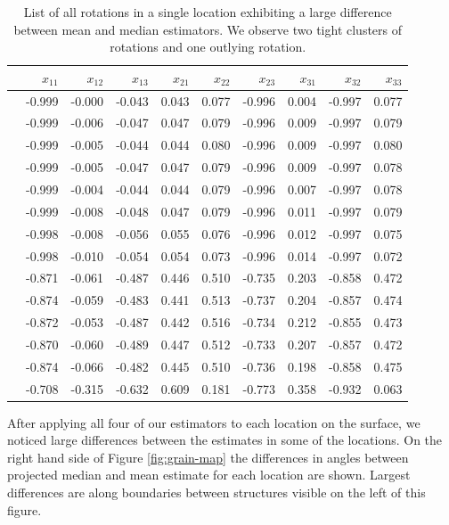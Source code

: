 \begin{table}[ht]
\caption{\label{tab:rotations} List of all rotations in a single location exhibiting a large difference between mean and median estimators. We observe two tight clusters of rotations and one outlying rotation. }
\begin{center}
\begin{tabular}{rrrrrrrrrr}
  \hline
 & $x_{11}$ & $x_{12}$& $x_{13}$& $x_{21}$& $x_{22}$& $x_{23}$& $x_{31}$& $x_{32}$& $x_{33}$ \\ 
  \hline
   & -0.999 & -0.000 & -0.043 & 0.043 & 0.077 & -0.996 & 0.004 & -0.997 & 0.077 \\ 
   & -0.999 & -0.006 & -0.047 & 0.047 & 0.079 & -0.996 & 0.009 & -0.997 & 0.079 \\ 
   & -0.999 & -0.005 & -0.044 & 0.044 & 0.080 & -0.996 & 0.009 & -0.997 & 0.080 \\ 
   & -0.999 & -0.005 & -0.047 & 0.047 & 0.079 & -0.996 & 0.009 & -0.997 & 0.078 \\ 
   & -0.999 & -0.004 & -0.044 & 0.044 & 0.079 & -0.996 & 0.007 & -0.997 & 0.078 \\ 
   & -0.999 & -0.008 & -0.048 & 0.047 & 0.079 & -0.996 & 0.011 & -0.997 & 0.079 \\ 
   & -0.998 & -0.008 & -0.056 & 0.055 & 0.076 & -0.996 & 0.012 & -0.997 & 0.075 \\ 
   & -0.998 & -0.010 & -0.054 & 0.054 & 0.073 & -0.996 & 0.014 & -0.997 & 0.072 \\ [5pt]
   & -0.871 & -0.061 & -0.487 & 0.446 & 0.510 & -0.735 & 0.203 & -0.858 & 0.472 \\ 
   & -0.874 & -0.059 & -0.483 & 0.441 & 0.513 & -0.737 & 0.204 & -0.857 & 0.474 \\ 
   & -0.872 & -0.053 & -0.487 & 0.442 & 0.516 & -0.734 & 0.212 & -0.855 & 0.473 \\ 
   & -0.870 & -0.060 & -0.489 & 0.447 & 0.512 & -0.733 & 0.207 & -0.857 & 0.472 \\ 
   & -0.874 & -0.066 & -0.482 & 0.445 & 0.510 & -0.736 & 0.198 & -0.858 & 0.475 \\ [5pt] 
 & -0.708 & -0.315 & -0.632 & 0.609 & 0.181 & -0.773 & 0.358 & -0.932 & 0.063 \\ 
   \hline
\end{tabular}
\end{center}
\end{table}

After applying all four of our estimators to each location on the surface, we noticed large differences between the estimates in some of the locations. On the right hand side of Figure \ref{fig:grain-map} the differences in angles between projected median and mean estimate for each location are shown. Largest differences are along boundaries between structures visible on the left of this figure.


